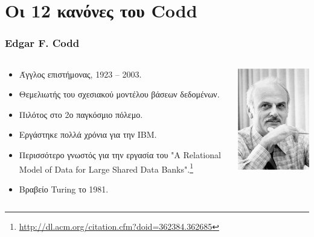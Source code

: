 

\section[\textlatin{Codd Rules}]{\textgreek{Οι 12 κανόνες του} \textlatin{Codd}}


\begin{frame}[t,fragile]
\frametitle{\en Edgar F. Codd}
\begin{columns}[T]
  \begin{column}{0.65\textwidth}
    \begin{itemize}
      \item Άγγλος επιστήμονας, 1923 -- 2003.
      \item Θεμελιωτής του σχεσιακού μοντέλου βάσεων δεδομένων.
      \item Πιλότος στο 2ο παγκόσμιο πόλεμο.
      \item Εργάστηκε πολλά χρόνια για την {\en IBM}.
      \item Περισσότερο γνωστός για την εργασία του 
           {\en\color{blue} "A Relational Model of Data for Large Shared Data Banks".\footnote{\url{http://dl.acm.org/citation.cfm?doid=362384.362685}}}
      \item Βραβείο {\sq Turing} το 1981.     
    \end{itemize}
  \end{column}
  \begin{column}{0.35\textwidth} \hspace*{-2cm}
    \includegraphics[scale=0.8]{Edgar_F_Codd.jpg}
  \end{column}
\end{columns}
\end{frame}



